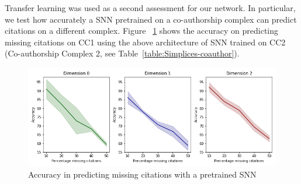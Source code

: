 Transfer learning was used as a second assessment for our network. In particular, we test how accurately a SNN pretrained on a co-authorship complex can predict citations on a different complex. Figure ~\ref{fig:transfer-learning} shows the accuracy on predicting missing citations on CC1 using the above architecture of SNN trained on CC2 (Co-authorship Complex 2, see Table~\ref{table:Simplices-coauthor}).



\begin{figure}[htbp]
  \centering
\includegraphics[scale=0.35]{./figures/accuracy_network1_pretrained.png}
  \caption{Accuracy in predicting missing citations with a pretrained SNN } \label{fig:transfer-learning}
\end{figure}

